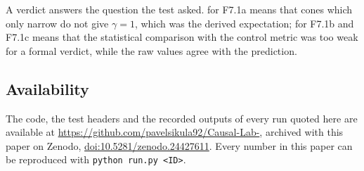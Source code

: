 A verdict answers the question the test asked.  for F7.1a means that cones which only
narrow do not give $\gamma=1$, which was the derived expectation;  for F7.1b and F7.1c
means that the statistical comparison with the control metric was too weak for a formal verdict, while the
raw values agree with the prediction.

\subsection{Availability}

The code, the test headers and the recorded outputs of every run quoted here are available at
\url{https://github.com/pavelsikula92/Causal-Lab-}, archived with this paper on Zenodo,
\href{https://doi.org/10.5281/zenodo.24427611}{doi:10.5281/zenodo.24427611}. Every number in this paper can be reproduced with \texttt{python run.py <ID>}.
